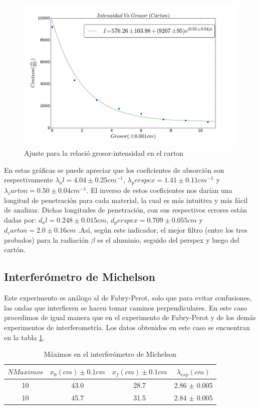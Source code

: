 \documentclass[%
 reprint,
 amsmath,amssymb,
 aps,
]{revtex4-1}
\begin{document}
\begin{figure}[h!]
\centering
\includegraphics[width=1.1\linewidth]{carton.jpg}
\caption{Ajuste para la relació grosor-intensidad en el carton}
\label{fig:aluminio}
\end{figure}


En estas gráficas se puede apreciar que los coeficientes de absorción son respectivamente $\lambda_al = 4.04\pm0.25cm^{-1}$, $\lambda_perspex = 1.41\pm0.11cm^{-1}$ y $\lambda_carton = 0.50\pm0.04cm^{-1}$. El inverso de estos coeficientes nos darían una longitud de penetración para cada material, la cual es más intuitiva y más fácil de analizar. Dichas longitudes de penetración, con sus respectivos errores están dadas por: $d_al = 0.248\pm0.015cm$, $d_perspex = 0.709\pm0.055cm$ y $d_carton = 2.0\pm0.16cm$ .Así, según este indicador, el mejor filtro (entre los tres probados) para la radiación $\beta$ es el aluminio, seguido del perspex y luego del cartón.\\

\subsection{\label{sec:level2}Interferómetro de Michelson}
Este experimento es análogo al de Fabry-Perot, solo que para evitar confusiones, las ondas que interfieren se hacen tomar caminos perpendiculares. En este caso procedimos de igual manera que en el experimento de Fabry-Perot y de los demás experimentos de interferometría. Los datos obtenidos en este caso se encuentran en la tabla \ref{table:Michelson}.\\

\begin{table}[h!]
\centering
 \begin{tabular}{|c|c|c|c|} 
 \hline
 $N Maximos$& $x_0(cm) \pm 0.1cm$ & $x_f(cm) \pm 0.1cm$ & $\lambda_{exp} (cm)$ \\ [0.5ex] 
 \hline\hline
 10 & 43.0 & 28.7 & 2.86 $\pm$ 0.005\\
 10 & 45.7 & 31.5 & 2.84 $\pm$ 0.005\\
[1ex] 
 \hline
 \end{tabular}
 \caption{Máximos en el interferómetro de Michelson}
 \label{table:Michelson}
\end{table} 
\end{document}
